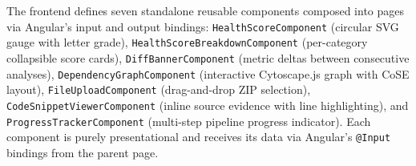 %
\par The frontend defines seven standalone reusable components composed into pages via Angular's input and output bindings: \texttt{HealthScoreComponent} (circular SVG gauge with letter grade), \texttt{Health\-Score\-Break\-down\-Com\-po\-nent} (per-category collapsible score cards), \texttt{Diff\-Ban\-ner\-Com\-po\-nent} (metric deltas between consecutive analyses), \texttt{De\-pen\-den\-cy\-Graph\-Com\-po\-nent} (interactive Cytoscape.js graph with CoSE layout), \texttt{File\-Up\-load\-Com\-po\-nent} (drag-and-drop ZIP selection), \texttt{Code\-Snip\-pet\-View\-er\-Com\-po\-nent} (inline source evidence with line highlighting), and \texttt{Pro\-gress\-Track\-er\-Com\-po\-nent} (multi-step pipeline progress indicator). Each component is purely presentational and receives its data via Angular's \texttt{@Input} bindings from the parent page.
